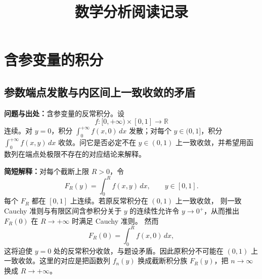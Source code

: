 \documentclass[11pt,a4paper]{ctexart}
\title{数学分析阅读记录}
\author{}
\date{}
\begin{document}
\maketitle

\section{含参变量的积分}

\subsection{参数端点发散与内区间上一致收敛的矛盾}
\label{note:analysis-parameter-improper-uniform-boundary}

\textbf{问题与出处：}含参变量的反常积分。设
\[
 f:[0,+\infty)\times[0,1]\longrightarrow\mathbb R
\]
连续。对 $y=0$，积分 $\int_0^{+\infty}f(x,0)\,dx$ 发散；对每个
$y\in(0,1]$，积分 $\int_0^{+\infty}f(x,y)\,dx$ 收敛。问它是否必定不在
$y\in(0,1)$ 上一致收敛，并希望用函数列在端点处极限不存在的对应结论来解释。

\textbf{简短解释：}对每个截断上限 $R>0$，令
\[
 F_R(y)=\int_0^R f(x,y)\,dx,\qquad y\in[0,1].
\]
每个 $F_R$ 都在 $[0,1]$ 上连续。若原反常积分在 $(0,1)$ 上一致收敛，
则一致 Cauchy 准则与有限区间含参积分关于 $y$ 的连续性允许令
$y\to0^+$，从而推出 $F_R(0)$ 在 $R\to+\infty$ 时满足 Cauchy 准则。
然而
\[
 F_R(0)=\int_0^R f(x,0)\,dx,
\]
这将迫使 $y=0$ 处的反常积分收敛，与题设矛盾。因此原积分不可能在
$(0,1)$ 上一致收敛。这里的对应是把函数列 $f_n(y)$ 换成截断积分族
$F_R(y)$，把 $n\to\infty$ 换成 $R\to+\infty$。

\end{document}
